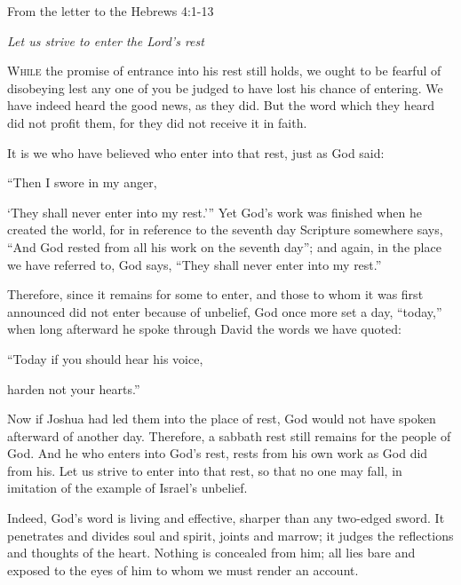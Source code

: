 \noindent From the letter to the Hebrews \hfill 4:1-13

\begin{center}\textit{Let us strive to enter the Lord’s rest}\end{center}

\lettrine[lines=3,loversize=0.15]{W}{hile} the promise of entrance into his rest still holds, we ought to be fearful of disobeying lest any one of you be judged to have lost his chance of entering. We have indeed heard the good news, as they did. But the word which they heard did not profit them, for they did not receive it in faith.

It is we who have believed who enter into that rest, just as God said:

\vspace{5pt}
 “Then I swore in my anger,\par
    ‘They shall never enter into my rest.’”
\vspace{5pt}
Yet God’s work was finished when he created the world, for in reference to the seventh day Scripture somewhere says, “And God rested from all his work on the seventh day”; and again, in the place we have referred to, God says, “They shall never enter into my rest.”

Therefore, since it remains for some to enter, and those to whom it was first announced did not enter because of unbelief, God once more set a day, “today,” when long afterward he spoke through David the words we have quoted:

\vspace{5pt}
   “Today if you should hear his voice,\par
      harden not your hearts.”
\vspace{5pt}

Now if Joshua had led them into the place of rest, God would not have spoken afterward of another day. Therefore, a sabbath rest still remains for the people of God. And he who enters into God’s rest, rests from his own work as God did from his. Let us strive to enter into that rest, so that no one may fall, in imitation of the example of Israel’s unbelief.

Indeed, God’s word is living and effective, sharper than any two-edged sword. It penetrates and divides soul and spirit, joints and marrow; it judges the reflections and thoughts of the heart. Nothing is concealed from him; all lies bare and exposed to the eyes of him to whom we must render an account.

\vspace{5pt}

